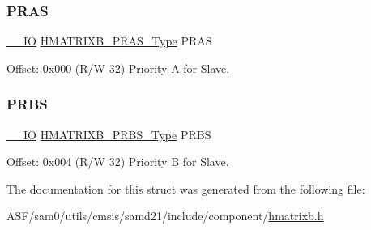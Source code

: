 \subsubsection{\texorpdfstring{PRAS}{PRAS}}
{\footnotesize\ttfamily \mbox{\hyperlink{core__cm0plus_8h_aec43007d9998a0a0e01faede4133d6be}{\+\_\+\+\_\+\+IO}} \mbox{\hyperlink{union_h_m_a_t_r_i_x_b___p_r_a_s___type}{H\+M\+A\+T\+R\+I\+X\+B\+\_\+\+P\+R\+A\+S\+\_\+\+Type}} P\+R\+AS}



Offset\+: 0x000 (R/W 32) Priority A for Slave. 

\mbox{\label{struct_hmatrixb_prs_a87cec3294a236e052862ec2f77c30909}} 
\subsubsection{\texorpdfstring{PRBS}{PRBS}}
{\footnotesize\ttfamily \mbox{\hyperlink{core__cm0plus_8h_aec43007d9998a0a0e01faede4133d6be}{\+\_\+\+\_\+\+IO}} \mbox{\hyperlink{union_h_m_a_t_r_i_x_b___p_r_b_s___type}{H\+M\+A\+T\+R\+I\+X\+B\+\_\+\+P\+R\+B\+S\+\_\+\+Type}} P\+R\+BS}



Offset\+: 0x004 (R/W 32) Priority B for Slave. 



The documentation for this struct was generated from the following file\+:\begin{DoxyCompactItemize}
\item 
A\+S\+F/sam0/utils/cmsis/samd21/include/component/\mbox{\hyperlink{hmatrixb_8h}{hmatrixb.\+h}}\end{DoxyCompactItemize}
